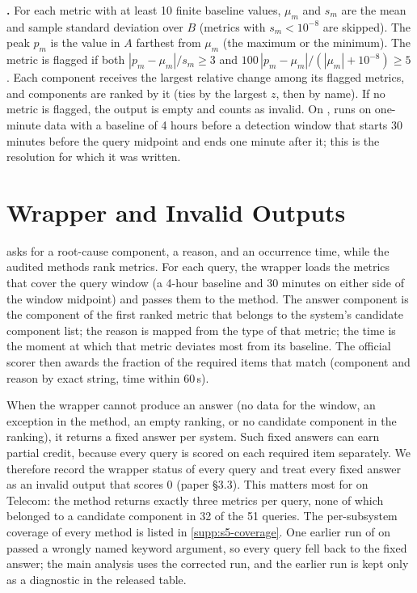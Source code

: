 \documentclass[10pt]{article}
\begin{document}
\textbf{\cdmin.}
For each metric with at least 10 finite baseline values, $\mu_m$ and $s_m$ are the mean and sample standard deviation over $B$ (metrics with $s_m < 10^{-8}$ are skipped).
The peak $p_m$ is the value in $A$ farthest from $\mu_m$ (the maximum or the minimum).
The metric is flagged if both $|p_m-\mu_m|/s_m \ge 3$ and $100\,|p_m-\mu_m|/(|\mu_m|+10^{-8}) \ge 5$.
Each component receives the largest relative change among its flagged metrics, and components are ranked by it (ties by the largest $z$, then by name).
If no metric is flagged, the output is empty and counts as invalid.
On \openrca, \cdmin runs on one-minute data with a baseline of 4 hours before a detection window that starts 30 minutes before the query midpoint and ends one minute after it; this is the resolution for which it was written.

\section{\openrca Wrapper and Invalid Outputs}
\label{sec:openrca}

\openrca asks for a root-cause component, a reason, and an occurrence time, while the audited methods rank metrics.
For each query, the wrapper loads the metrics that cover the query window (a 4-hour baseline and 30 minutes on either side of the window midpoint) and passes them to the method.
The answer component is the component of the first ranked metric that belongs to the system's candidate component list; the reason is mapped from the type of that metric; the time is the moment at which that metric deviates most from its baseline.
The official scorer then awards the fraction of the required items that match (component and reason by exact string, time within 60\,s).

When the wrapper cannot produce an answer (no data for the window, an exception in the method, an empty ranking, or no candidate component in the ranking), it returns a fixed answer per system.
Such fixed answers can earn partial credit, because every query is scored on each required item separately.
We therefore record the wrapper status of every query and treat every fixed answer as an invalid output that scores 0 (paper \S3.3).
This matters most for \ediag on Telecom: the method returns exactly three metrics per query, none of which belonged to a candidate component in 32 of the 51 queries.
The per-subsystem coverage of every method is listed in \cref{supp:s5-coverage}.
One earlier run of \alertcount on \openrca passed a wrongly named keyword argument, so every query fell back to the fixed answer; the main analysis uses the corrected run, and the earlier run is kept only as a diagnostic in the released table.
\end{document}
